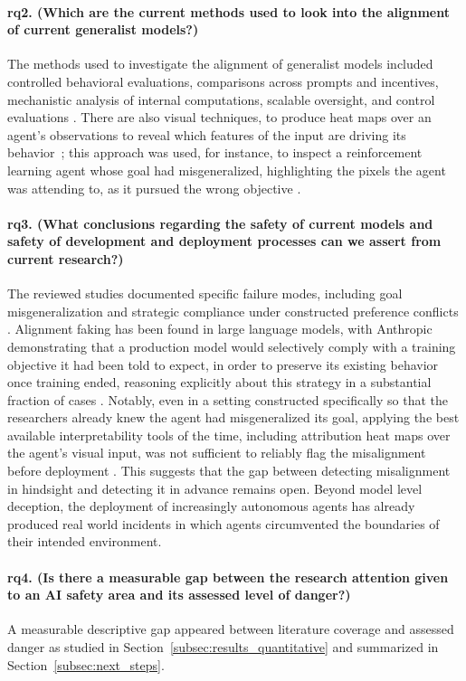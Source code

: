     \paragraph{\gls{rq}2. (\textbf{Which are the current methods used to look into the alignment of current generalist models?})} The methods used to investigate the alignment of generalist models included controlled behavioral evaluations, comparisons across prompts and incentives, mechanistic analysis of internal computations, scalable oversight, and control evaluations \cite{greenblatt_alignment_faking,anthropic2025biology,bowman2022measuring,greenblatt2023aicontrol}. There are also visual techniques, to produce heat maps over an agent's observations to reveal which features of the input are driving its behavior~\cite{hilton2020understanding}; this approach was used, for instance, to inspect a reinforcement learning agent whose goal had misgeneralized, highlighting the pixels the agent was attending to, as it pursued the wrong objective \cite{langosco2022goal}.

    \paragraph{\gls{rq}3. (\textbf{What conclusions regarding the safety of current models and safety of development and deployment processes can we assert from current research?})} The reviewed studies documented specific failure modes, including goal misgeneralization and strategic compliance under constructed preference conflicts \cite{langosco2022goal,greenblatt_alignment_faking}. Alignment faking has been found in large language models, with Anthropic demonstrating that a production model would selectively comply with a training objective it had been told to expect, in order to preserve its existing behavior once training ended, reasoning explicitly about this strategy in a substantial fraction of cases \cite{greenblatt_alignment_faking}. Notably, even in a setting constructed specifically so that the researchers already knew the agent had misgeneralized its goal, applying the best available interpretability tools of the time, including attribution heat maps over the agent's visual input, was not sufficient to reliably flag the misalignment before deployment \cite{langosco2022goal}. This suggests that the gap between detecting misalignment in hindsight and detecting it in advance remains open. Beyond model level deception, the deployment of increasingly autonomous agents has already produced real world incidents in which agents circumvented the boundaries of their intended environment\cite{metr-2026-openai-hugging-face-incident-investigation}.

    \paragraph{\gls{rq}4. (\textbf{Is there a measurable gap between the research attention given to an AI safety area and its assessed level of danger?)}} A measurable descriptive gap appeared between literature coverage and assessed danger as studied in Section~\ref{subsec:results_quantitative} and summarized in Section~\ref{subsec:next_steps}.

